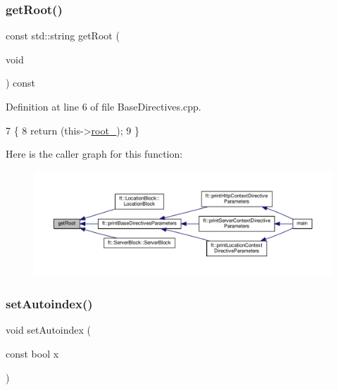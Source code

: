 \subsubsection{\texorpdfstring{get\+Root()}{getRoot()}}
{\footnotesize\ttfamily const std\+::string get\+Root (\begin{DoxyParamCaption}\item[{void}]{ }\end{DoxyParamCaption}) const\hspace{0.3cm}{\ttfamily [inherited]}}



Definition at line 6 of file Base\+Directives.\+cpp.


\begin{DoxyCode}
7     \{
8         \textcolor{keywordflow}{return} (this->\hyperlink{classft_1_1_base_directives_abb1eaf0bba10b90172d6152e69457dc7}{root\_});
9     \}
\end{DoxyCode}
Here is the caller graph for this function\+:
\nopagebreak
\begin{figure}[H]
\begin{center}
\leavevmode
\includegraphics[width=350pt]{classft_1_1_base_directives_aa5dbcb08bda0a0e7e502d2df7cf64287_icgraph}
\end{center}
\end{figure}
\mbox{\label{classft_1_1_base_directives_ae7293c7bbf34e9bdc60c540dccd53342}} 
\subsubsection{\texorpdfstring{set\+Autoindex()}{setAutoindex()}}
{\footnotesize\ttfamily void set\+Autoindex (\begin{DoxyParamCaption}\item[{const bool}]{x }\end{DoxyParamCaption})\hspace{0.3cm}{\ttfamily [inherited]}}



